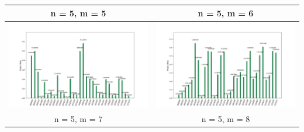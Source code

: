 \newpage
\begin{landscape}
\begin{table}[ht]
    \begin{tabular}{c c} 
        \hline
        n = 5, m = 5 & n = 5, m = 6 \\ \hline
        \includegraphics[scale=0.32]{Grover_results/Grover_n=5,m=5.png} & \includegraphics[scale=0.32]{Grover_results/Grover_n=5,m=6.png} \\ \hline
        n = 5, m = 7 & n = 5, m = 8 \\ \hline

\end{tabular}
\end{table}
\end{landscape}
